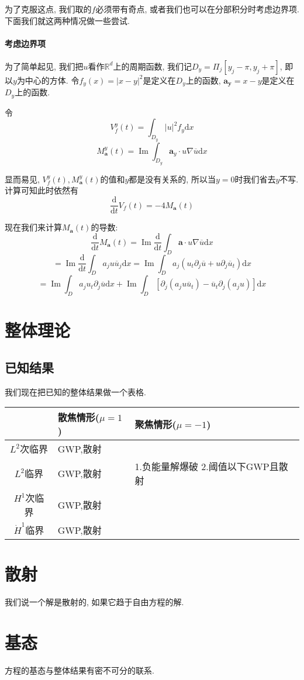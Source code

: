 \documentclass{ctexbook}
\theoremstyle{definition}
\theoremstyle{remark}
\newcommand{\dif}{\mathrm{d}}
\newcommand{\ovl}{\overline}
\begin{document}
为了克服这点, 我们取的$f$必须带有奇点, 或者我们也可以在分部积分时考虑边界项. 下面我们就这两种情况做一些尝试. 

\paragraph{考虑边界项}为了简单起见, 我们把$u$看作$\mathbb{R}^d$上的周期函数, 我们记$D_y=\Pi_j[y_j-\pi,y_j+\pi]$, 即以$y$为中心的方体. 令$f_y(x)=|x-y|^2$是定义在$D_y$上的函数, $\bm{a_y}=x-y$是定义在$D_y$上的函数. 

令
$$V_f^y(t)=\int_{D_y}|u|^2f_y\dif x$$
$$M_{\bm{a}}^y(t)=\operatorname{Im}\int_{D_y}\bm{a}_y\cdot u\nabla\ovl{u}\dif x$$

显而易见, $V_f^y(t),M_{\bm{a}}^y(t)$的值和$y$都是没有关系的, 所以当$y=0$时我们省去$y$不写. 计算可知此时依然有
$$\frac{\dif}{\dif t}V_f(t)=-4M_{\bm{a}}(t)$$

现在我们来计算$M_{\bm{a}}(t)$的导数: 
$$\frac{\dif}{\dif t}M_{\bm{a}}(t)=\operatorname{Im}\frac{\dif}{\dif t}\int_{D}\bm{a}\cdot u\nabla\ovl{u}\dif x$$
$$=\operatorname{Im}\frac{\dif}{\dif t}\int_{D}a_ju\ovl{u}_j\dif x=\operatorname{Im}\int_{D}a_j(u_t\partial_j\ovl{u}+u\partial_j\ovl{u}_t)\dif x$$
$$=\operatorname{Im}\int_{D}a_ju_t\partial_j\ovl{u}\dif x+\operatorname{Im}\int_{D}\left[\partial_j(a_ju\ovl{u}_t)-\ovl{u}_t\partial_j(a_ju)\right]\dif x$$
\section{整体理论}
\subsection{已知结果}
我们现在把已知的整体结果做一个表格. 

\begin{tabular}{|c|p{4cm}|p{4cm}|}
\hline
& 散焦情形($\mu=1$)&聚焦情形($\mu=-1$)\\
\hline
$L^2$次临界& GWP,散射 & \\
\hline
$L^2$临界& GWP,散射 &1.负能量解爆破 2.阈值以下GWP且散射\\
\hline
$H^1$次临界& GWP,散射 &\\
\hline
$\dot{H}^1$临界& GWP,散射 &\\
\hline
\end{tabular}
\section{散射}
我们说一个解是散射的, 如果它趋于自由方程的解. 
\section{基态}
方程的基态与整体结果有密不可分的联系. 
\end{document}
